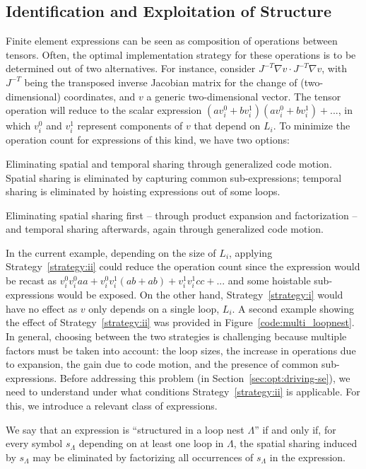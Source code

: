 \subsection{Identification and Exploitation of Structure}
\label{sec:se-rln}
Finite element expressions can be seen as composition of operations between tensors. Often, the optimal implementation strategy for these operations is to be determined out of two alternatives. For instance, consider $J^{-T} \nabla v \cdot J^{-T} \nabla v$, with $J^{-T}$ being the transposed inverse Jacobian matrix for the change of (two-dimensional) coordinates, and $v$ a generic two-dimensional vector. The tensor operation will reduce to the scalar expression $(a v^0_i + b v^1_i) (a v^0_i + b v^1_i) + ...$, in which $v^0_i$ and $v^1_i$ represent components of $v$ that depend on $L_i$. To minimize the operation count for expressions of this kind, we have two options:
\begin{Strategy}
\label{strategy:i}
Eliminating spatial and temporal sharing through generalized code motion. Spatial sharing is eliminated by capturing common sub-expressions; temporal sharing is eliminated by hoisting expressions out of some loops.
\end{Strategy}
\begin{Strategy}
\label{strategy:ii}
Eliminating spatial sharing first -- through product expansion and factorization -- and temporal sharing afterwards, again through generalized code motion.
\end{Strategy}
In the current example, depending on the size of $L_i$, applying Strategy~\ref{strategy:ii} could reduce the operation count since the expression would be recast as $v^0_i v^0_i a a + v^0_i v^1_i (ab + ab) + v^1_i v^1_i c c + ...$ and some hoistable sub-expressions would be exposed. On the other hand, Strategy~\ref{strategy:i} would have no effect as $v$ only depends on a single loop, $L_i$. A second example showing the effect of Strategy~\ref{strategy:ii} was provided in Figure~\ref{code:multi_loopnest}. In general, choosing between the two strategies is challenging because multiple factors must be taken into account: the loop sizes, the increase in operations due to expansion, the gain due to code motion, and the presence of common sub-expressions. Before addressing this problem (in Section~\ref{sec:opt:driving-se}), we need to understand under what conditions Strategy~\ref{strategy:ii} is applicable. For this, we introduce a relevant class of expressions.
\begin{Def}
\label{def:struct-expr}
We say that an expression is ``structured in a loop nest $\Lambda$'' if and only if, for every symbol $s_{\Lambda}$ depending on at least one loop in $\Lambda$, the spatial sharing induced by $s_{\Lambda}$ may be eliminated by factorizing all occurrences of $s_{\Lambda}$ in the expression.
\end{Def}
